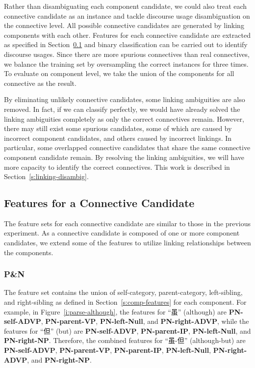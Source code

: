 Rather than disambiguating each component candidate, we could also treat each connective
candidate as an instance and tackle discourse usage disambiguation on the connective
level. All possible connective candidates are  generated by linking components with
each other. Features for each connective candidate are extracted as specified in
Section~\ref{s:connective-features} and binary
classification can be carried out to identify discourse usages.
Since there are more spurious connectives than real connectives, we balance the
training set by oversampling the correct instances for three times. To evaluate on
component level, we take the union of the components for all connective as the result.

By eliminating unlikely connective candidates, some linking ambiguities 
are also removed. In fact, if we can classify perfectly, we would have already
solved the linking ambiguities completely as only the correct connectives remain.
However, there may still exist some spurious candidates, some of which are
caused by incorrect component candidates, and others caused by
incorrect linkings.
In particular, some overlapped connective candidates that share the same
connective component candidate remain. By resolving the linking
ambiguities, we will have more capacity to identify the correct connectives. This
work is described in Section~\ref{s:linking-disambig}.

\subsection{Features for a Connective Candidate}
\label{s:connective-features}

The feature sets for each connective candidate are similar to those in the previous
experiment. As a connective candidate is composed of one or more component candidates,
we extend some of the features to utilize linking relationships between the
components.

\subsubsection{P\&N}

The feature set contains the union of self-category, parent-category, left-sibling,
and right-sibling as defined in Section~\ref{s:comp-features} for each component.
For example, in Figure~\ref{i:parse-although}, the features for ``虽'' (although) are
\textbf{PN-self-ADVP}, \textbf{PN-parent-VP}, \textbf{PN-left-Null}, and \textbf{PN-right-ADVP}, while
the features for ``但'' (but) are \textbf{PN-self-ADVP}, \textbf{PN-parent-IP}, \textbf{PN-left-Null},
and \textbf{PN-right-NP}. Therefore, the combined features for ``虽-但'' (although-but) are
\textbf{PN-self-ADVP}, \textbf{PN-parent-VP}, \textbf{PN-parent-IP}, \textbf{PN-left-Null},
\textbf{PN-right-ADVP}, and \textbf{PN-right-NP}.


